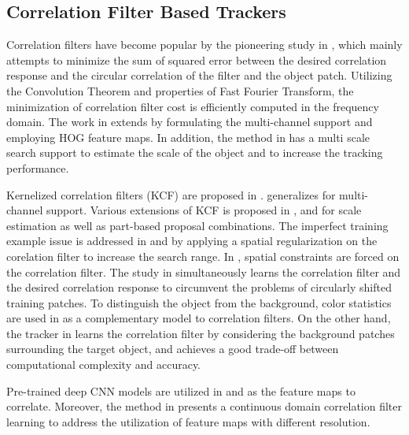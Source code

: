 \documentclass[journal]{IEEEtran}
\begin{document}
\subsection{Correlation Filter Based Trackers}
Correlation filters have become popular by the pioneering study in \cite{MOSSE}, which mainly attempts to minimize the sum of squared error between the desired correlation response and the circular correlation of the filter and the object patch. Utilizing the Convolution Theorem and properties of Fast Fourier Transform, the minimization of correlation filter cost is efficiently computed in the frequency domain. The work in \cite{DSST} extends \cite{MOSSE} by formulating the multi-channel support and employing HOG feature maps. In addition, the method in \cite{DSST} has a multi scale search support to estimate the scale of the object and to increase the tracking performance. 

Kernelized correlation filters (KCF) are proposed in \cite{circulant}. \cite{KCF} generalizes \cite{circulant} for multi-channel support. Various extensions of KCF is proposed in \cite{dpKCF}, \cite{sKCF} and \cite{PartBasedCorrelation} for scale estimation as well as part-based proposal combinations. The imperfect training example issue is addressed in \cite{LimitedBoundaries} and \cite{SRDCF} by applying a spatial regularization on the corelation filter to increase the search range. In \cite{ChanSpatial}, spatial constraints are forced on the correlation filter. The study in \cite{TRA} simultaneously learns the correlation filter and the desired correlation response to circumvent the problems of circularly shifted training patches. To distinguish the object from the background, color statistics are used in \cite{STAPLE} as a complementary model to correlation filters. On the other hand, the tracker in \cite{CACF} learns the correlation filter by considering the background patches surrounding the target object, and achieves a good trade-off between computational complexity and accuracy.

Pre-trained deep CNN models are utilized in \cite{HCF} and \cite{deepSRDCF} as the feature maps to correlate. Moreover, the method in \cite{CCOT} presents a continuous domain correlation filter learning to address the utilization of feature maps with different resolution.
\end{document}
